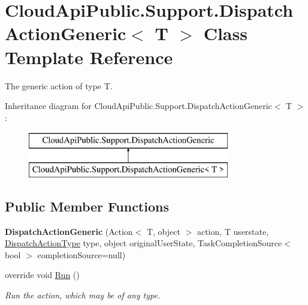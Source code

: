 \hypertarget{class_cloud_api_public_1_1_support_1_1_dispatch_action_generic_3_01_t_01_4}{\section{Cloud\-Api\-Public.\-Support.\-Dispatch\-Action\-Generic$<$ T $>$ Class Template Reference}
\label{class_cloud_api_public_1_1_support_1_1_dispatch_action_generic_3_01_t_01_4}
}


The generic action of type T.  


Inheritance diagram for Cloud\-Api\-Public.\-Support.\-Dispatch\-Action\-Generic$<$ T $>$\-:\begin{figure}[H]
\begin{center}
\leavevmode
\includegraphics[height=2.000000cm]{class_cloud_api_public_1_1_support_1_1_dispatch_action_generic_3_01_t_01_4}
\end{center}
\end{figure}
\subsection*{Public Member Functions}
\begin{DoxyCompactItemize}
\item 
\hypertarget{class_cloud_api_public_1_1_support_1_1_dispatch_action_generic_3_01_t_01_4_acbb842209c34194b5f5bf46812b235e5}{{\bfseries Dispatch\-Action\-Generic} (Action$<$ T, object $>$ action, T userstate, \hyperlink{namespace_cloud_api_public_1_1_support_ae4ed3cc109410edb339c363c77eb4117}{Dispatch\-Action\-Type} type, object original\-User\-State, Task\-Completion\-Source$<$ bool $>$ completion\-Source=null)}\label{class_cloud_api_public_1_1_support_1_1_dispatch_action_generic_3_01_t_01_4_acbb842209c34194b5f5bf46812b235e5}

\item 
override void \hyperlink{class_cloud_api_public_1_1_support_1_1_dispatch_action_generic_3_01_t_01_4_af56315453816fe2fe2967e5a63ce2e46}{Run} ()
\begin{DoxyCompactList}\small\item\em Run the action, which may be of any type. \end{DoxyCompactList}\end{DoxyCompactItemize}
